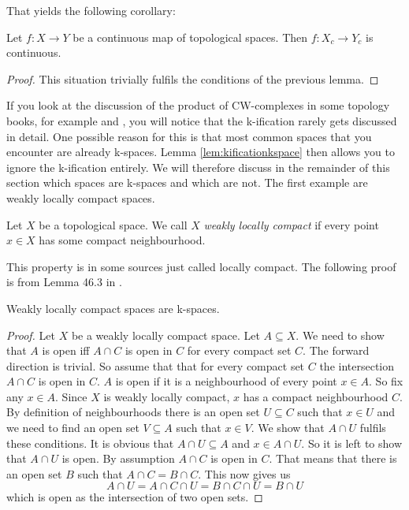 That yields the following corollary: 

\begin{cor}
    Let $f \colon X \to Y$ be a continuous map of topological spaces.
    Then $f \colon X_c \to Y_c$ is continuous.
\end{cor}
\begin{proof}
    This situation trivially fulfils the conditions of the previous lemma.
\end{proof}

If you look at the discussion of the product of CW-complexes in some topology books, for example \cite{Hatcher2001} and \cite{Lück2005}, you will notice that the k-ification rarely gets discussed in detail. 
One possible reason for this is that most common spaces that you encounter are already k-spaces.
Lemma \ref{lem:kificationkspace} then allows you to ignore the k-ification entirely. 
We will therefore discuss in the remainder of this section which spaces are k-spaces and which are not.
The first example are weakly locally compact spaces.

\begin{defi}
    Let $X$ be a topological space.
    We call $X$ \emph{weakly locally compact} if every point $x \in X$ has some compact neighbourhood.
\end{defi}

This property is in some sources just called locally compact.
The following proof is from Lemma 46.3 in \cite{Munkres2014}.

\begin{lem} \label{lem:weaklylocallycompactiskspace}
    Weakly locally compact spaces are k-spaces.
\end{lem}
\begin{proof}
    Let $X$ be a weakly locally compact space. 
    Let $A \subseteq X$.
    We need to show that $A$ is open iff $A \cap C$ is open in $C$ for every compact set $C$.
    The forward direction is trivial. 
    So assume that that for every compact set $C$ the intersection $A \cap C$ is open in $C$.
    $A$ is open if it is a neighbourhood of every point $x \in A$.
    So fix any $x \in A$.
    Since $X$ is weakly locally compact, $x$ has a compact neighbourhood $C$.
    By definition of neighbourhoods there is an open set $U \subseteq C$ such that $x \in U$ and we need to find an open set $V \subseteq A$ such that $x \in V$.
    We show that $A \cap U$ fulfils these conditions. 
    It is obvious that $A \cap U \subseteq A$ and $x \in A \cap U$. 
    So it is left to show that $A \cap U$ is open.
    By assumption $A \cap C$ is open in $C$. 
    That means that there is an open set $B$ such that $A \cap C = B \cap C$. 
    This now gives us 
    \[A \cap U = A \cap C \cap U = B \cap C \cap U = B \cap U\]
    which is open as the intersection of two open sets. 
\end{proof}

